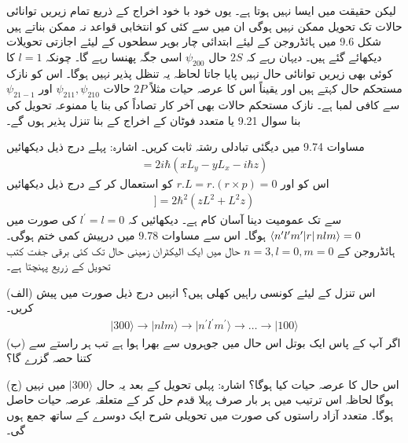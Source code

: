  لیکن حقیقت میں ایسا نہیں ہوتا ہے۔ یوں خود با خود اخراج کے ذریع تمام زیریں توانائی حالات تک تحویل ممکن نہیں ہوگی ان میں سے کئی کو انتخابی قواعد نہ ممکن بناتے ہیں شکل \num{9.6} میں ہائڈروجن کے لیئے ابتدائی چار بوہر سطحوں کے لیئے اجازتی تحویلات دیکھائے گئے ہیں۔ دیہان رہے کہ \(2S\) حال  \(\psi_{200}\) اسی جگہ پھنسا رہے گا۔ چونکہ \(l=1\) کا کوئی بھی زیریں توانائی حال نہیں پایا جاتا لحاظہ یہ تنظل پذیر نہیں ہوگا۔ اس کو نازک مستحکم حال کہتے ہیں اور یقیناً اس کا عرصہ حیات مثلاً \(2P\) حالات \(\psi_{211}, \psi_{210}\) اور \(\psi_{21-1}\) سے کافی لمبا ہے۔ نازک مستحکم حالات بھی آخر کار تصاداً کی بنا یا ممنوعہ تحویل کی بنا سوال \num{9.21} یا متعدد فوٹان  کے اخراج کے بنا تنزل پذیر ہوں گے۔
 
مساوات \num{9.74} میں دیگئی تبادلی رشتہ ثابت کریں۔ اشارہ: پہلے درج ذیل دیکھائیں
\begin{align*}
	[L^2, z] = 2i\hbar(xL_y-yL_x-i\hbar z)
\end{align*}
اس کو اور \(r.L = r.(r\times p) = 0\) کو استعمال کر کے درج ذیل دیکھائیں
\begin{align*}
[L^2, [L^2, z]] = 2\hbar^2(zL^2+L^2z)	
\end{align*}
 سے  تک عمومیت دینا آسان کام ہے۔
دیکھائیں کہ \(l^\prime = l = 0\) کی صورت میں \(\langle n^\prime l^\prime m^\prime \abs{r}nlm \rangle = 0\) ہوگا۔ اس سے مساوات \num{9.78} میں درپیش کمی ختم ہوگی۔
ہائڈروجن کے \(n = 3, l = 0, m = 0\) حال میں ایک الیکٹران زمینی حال تک کئی برقی جفت کتب تحویل کے زریع پہنچتا ہے۔

(الف) اس تنزل کے لیئے کونسی راہیں کھلی ہیں؟ انہیں درج ذیل صورت میں پیش کریں۔
\begin{align*}
	\mid300\rangle\rightarrow \mid nlm\rangle\rightarrow \mid n^\prime l^\prime m^\prime \rangle\rightarrow\dots\rightarrow\mid100\rangle
\end{align*}
(ب) اگر آپ کے پاس ایک بوتل اس حال میں جوہروں سے بھرا ہوا ہے تب ہر راستے سے کتنا حصہ گزرے گا؟

(ج) اس حال کا عرصہ حیات کیا ہوگا؟ اشارہ: پہلی تحویل کے بعد یہ حال \(\mid300\rangle\) میں نہیں ہوگا لحاظہ اس ترتیب میں ہر بار صرف پہلا قدم حل کر کے متعلقہ عرصہ حیات حاصل ہوگا۔ متعدد آزاد راستوں کی صورت میں تحویلی شرح ایک دوسرے کے ساتھ جمع ہوں گی۔

